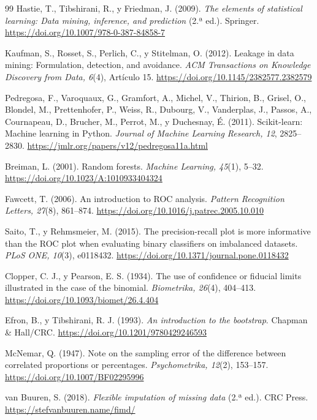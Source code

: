 \documentclass[10pt,letterpaper,twocolumn]{article}
\begin{document}
{\begin{thebibliography}{99}
Hastie, T., Tibshirani, R., y Friedman, J. (2009). \textit{The elements of statistical learning: Data mining, inference, and prediction} (2.ª ed.). Springer. \url{https://doi.org/10.1007/978-0-387-84858-7}

Kaufman, S., Rosset, S., Perlich, C., y Stitelman, O. (2012). Leakage in data mining: Formulation, detection, and avoidance. \textit{ACM Transactions on Knowledge Discovery from Data, 6}(4), Artículo 15. \url{https://doi.org/10.1145/2382577.2382579}

Pedregosa, F., Varoquaux, G., Gramfort, A., Michel, V., Thirion, B., Grisel, O., Blondel, M., Prettenhofer, P., Weiss, R., Dubourg, V., Vanderplas, J., Passos, A., Cournapeau, D., Brucher, M., Perrot, M., y Duchesnay, É. (2011). Scikit-learn: Machine learning in Python. \textit{Journal of Machine Learning Research, 12}, 2825--2830. \url{https://jmlr.org/papers/v12/pedregosa11a.html}

Breiman, L. (2001). Random forests. \textit{Machine Learning, 45}(1), 5--32. \url{https://doi.org/10.1023/A:1010933404324}

Fawcett, T. (2006). An introduction to ROC analysis. \textit{Pattern Recognition Letters, 27}(8), 861--874. \url{https://doi.org/10.1016/j.patrec.2005.10.010}

Saito, T., y Rehmsmeier, M. (2015). The precision-recall plot is more informative than the ROC plot when evaluating binary classifiers on imbalanced datasets. \textit{PLoS ONE, 10}(3), e0118432. \url{https://doi.org/10.1371/journal.pone.0118432}

Clopper, C. J., y Pearson, E. S. (1934). The use of confidence or fiducial limits illustrated in the case of the binomial. \textit{Biometrika, 26}(4), 404--413. \url{https://doi.org/10.1093/biomet/26.4.404}

Efron, B., y Tibshirani, R. J. (1993). \textit{An introduction to the bootstrap}. Chapman \& Hall/CRC. \url{https://doi.org/10.1201/9780429246593}

McNemar, Q. (1947). Note on the sampling error of the difference between correlated proportions or percentages. \textit{Psychometrika, 12}(2), 153--157. \url{https://doi.org/10.1007/BF02295996}

van Buuren, S. (2018). \textit{Flexible imputation of missing data} (2.ª ed.). CRC Press. \url{https://stefvanbuuren.name/fimd/}

\end{thebibliography}
}
\end{document}
